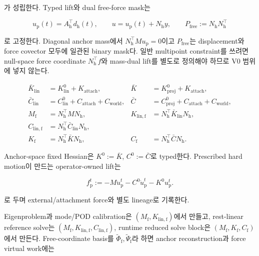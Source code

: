 \documentclass[11pt,a4paper]{article}
\begin{document}
가 성립한다. Typed lift와 dual free-force mask는

\begin{equation}
  u_{\mathrm p}(t)=A_{\mathrm h}^\top d_{\mathrm h}(t),
  \qquad
  u=u_{\mathrm p}(t)+N_{\mathrm h}y,
  \qquad
  P_{\mathrm{free}}:=N_{\mathrm h}N_{\mathrm h}^\top
  \label{eq:coordinate-hard-support-contract}
\end{equation}

로 고정한다. Diagonal anchor mass에서 \(N_{\mathrm h}^\top Mu_{\mathrm p}=0\)이고
\(P_{\mathrm{free}}\)는 displacement와 force covector 모두에 일관된 binary mask다.
일반 multipoint constraint를 쓰려면 null-space force coordinate
\(N_{\mathrm h}^\top f\)와 mass-dual lift를 별도로 정의해야 하므로 V0 범위에 넣지 않는다.

\begin{equation}
\begin{aligned}
  \bar K_{\mathrm{lin}}&=K_{\mathrm{lin}}^0+K_{\mathrm{attach}},
  &\bar K&=K_{\mathrm{proj}}^0+K_{\mathrm{attach}},\\
  \bar C_{\mathrm{lin}}&=C_{\mathrm{lin}}^0+C_{\mathrm{attach}}+C_{\mathrm{world}},
  &\bar C&=C_{\mathrm{proj}}^0+C_{\mathrm{attach}}+C_{\mathrm{world}},\\
  M_{\mathrm f}&=N_{\mathrm h}^\top MN_{\mathrm h},
  &K_{\mathrm{lin,f}}&=N_{\mathrm h}^\top\bar K_{\mathrm{lin}}N_{\mathrm h},\\
  C_{\mathrm{lin,f}}&=N_{\mathrm h}^\top\bar C_{\mathrm{lin}}N_{\mathrm h},\\
  K_{\mathrm f}&=N_{\mathrm h}^\top\bar KN_{\mathrm h},
  &C_{\mathrm f}&=N_{\mathrm h}^\top\bar CN_{\mathrm h}.
  \label{eq:hard-attachment-free-operators}
\end{aligned}
\end{equation}

Anchor-space fixed Hessian은 \(K^0:=\bar K\), \(C^0:=\bar C\)로 typed한다.
Prescribed hard motion이 만드는 operator-owned lift는

\begin{equation}
  f_{\mathrm p}^t
  :=-M\ddot u_{\mathrm p}^t-C^0\dot u_{\mathrm p}^t-K^0u_{\mathrm p}^t.
  \label{eq:hard-support-lift-force}
\end{equation}

로 두며 external/attachment force와 별도 lineage로 기록한다.

Eigenproblem과 mode/POD calibration은 \((M_{\mathrm f},K_{\mathrm{lin,f}})\)에서 만들고,
rest-linear reference solve는
\((M_{\mathrm f},K_{\mathrm{lin,f}},C_{\mathrm{lin,f}})\),
runtime reduced solve block은 \((M_{\mathrm f},K_{\mathrm f},C_{\mathrm f})\)에서 만든다.
Free-coordinate basis를 \(\widetilde\Phi_{\mathrm f},\widetilde\Psi_{\mathrm f}\)라 하면
anchor reconstruction과 force virtual work에는
\end{document}
